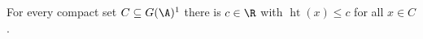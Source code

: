 For every compact set $C\subseteq G(\A)^1$ there is $c\in\R$ with $\operatorname{ht}(x)\le c$ for all $x\in C$.

